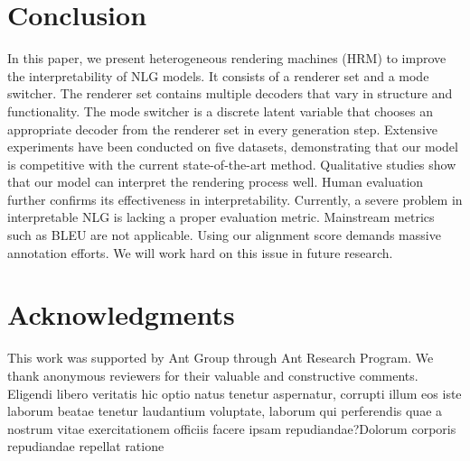 \documentclass[letterpaper]{article} %
\begin{document}
\vspace{-3.63mm}
\section{Conclusion}

In this paper, we present heterogeneous rendering machines (HRM) to improve the interpretability of NLG models. It consists of a renderer set and a mode switcher. The renderer set contains multiple decoders that vary in structure and functionality. The mode switcher is a discrete latent variable that chooses an appropriate decoder from the renderer set in every generation step. Extensive experiments have been conducted on five datasets, demonstrating that our model is competitive with the current state-of-the-art method. Qualitative studies show that our model can interpret the rendering process well. Human evaluation further confirms its effectiveness in interpretability.  Currently, a severe problem in interpretable NLG is lacking a proper evaluation metric. Mainstream metrics such as BLEU are not applicable. Using our alignment score demands massive annotation efforts. We will work hard on this issue in future research.

\section*{Acknowledgments}

This work was supported by Ant Group through Ant Research Program. We thank anonymous reviewers for their valuable and constructive comments.  Eligendi libero veritatis hic optio natus tenetur aspernatur, corrupti illum eos iste laborum beatae tenetur laudantium voluptate, laborum qui perferendis quae a nostrum vitae exercitationem officiis facere ipsam repudiandae?Dolorum corporis repudiandae repellat ratione


\end{document}
